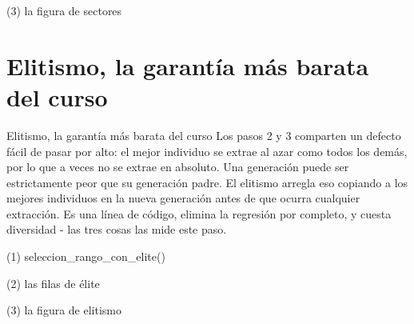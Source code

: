 \begin{frame}[fragile]{(3) la figura de sectores}

\end{frame}


\section{Elitismo, la garantía más barata del curso}

\begin{frame}{Elitismo, la garantía más barata del curso}
Los pasos 2 y 3 comparten un defecto fácil de pasar por alto: el mejor individuo
se extrae al azar como todos los demás, por lo que a veces no se extrae en absoluto. Una
generación puede ser estrictamente peor que su generación padre. El elitismo arregla eso
copiando a los mejores individuos en la nueva generación antes de que ocurra cualquier
extracción. Es una línea de código, elimina la regresión por completo, y
cuesta diversidad - las tres cosas las mide este paso.
\end{frame}

\begin{frame}[fragile]{(1) seleccion\_rango\_con\_elite()}

\end{frame}

\begin{frame}[fragile]{(2) las filas de élite}

\end{frame}

\begin{frame}[fragile]{(3) la figura de elitismo}

\end{frame}

